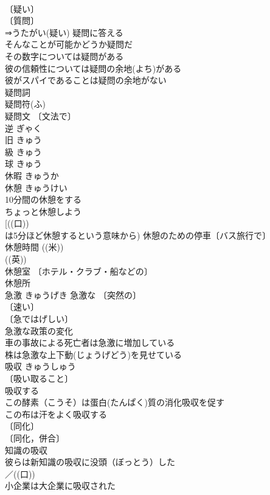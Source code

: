 \documentclass[8pt]{extreport}
\begin{document}
\begin{CJK}{UTF8}{min}
\\	〔疑い〕
\\	〔質問〕
\\	⇒うたがい(疑い) 疑問に答える 
\\	そんなことが可能かどうか疑問だ 
\\	その数字については疑問がある 
\\	彼の信頼性については疑問の余地(よち)がある 
\\	彼がスパイであることは疑問の余地がない 
\\	疑問詞 
\\	疑問符(ふ) 
\\	疑問文 〔文法で〕
\\	逆	ぎゃく	
\\	旧	きゅう	
\\	級	きゅう	
\\	球	きゅう	
\\	休暇	きゅうか	
\\	休憩	きゅうけい	
\\	10分間の休憩をする 
\\	ちょっと休憩しよう 
\\	[((口)) 
\\	は5分ほど休憩するという意味から) 休憩のための停車〔バス旅行で〕 
\\	休憩時間 ((米)) 
\\	((英)) 
\\	休憩室 〔ホテル・クラブ・船などの〕
\\	休憩所 
\\	急激	きゅうげき	急激な 〔突然の〕
\\	〔速い〕
\\	〔急ではげしい〕
\\	急激な政策の変化 
\\	車の事故による死亡者は急激に増加している 
\\	株は急激な上下動(じょうげどう)を見せている 
\\	吸収	きゅうしゅう	
\\	〔吸い取ること〕
\\	吸収する 
\\	この酵素（こうそ）は蛋白(たんぱく)質の消化吸収を促す 
\\	この布は汗をよく吸収する 
\\	〔同化〕
\\	〔同化，併合〕
\\	知識の吸収 
\\	彼らは新知識の吸収に没頭（ぼっとう）した 
\\	／((口)) 
\\	小企業は大企業に吸収された 

\end{CJK}
\end{document}
